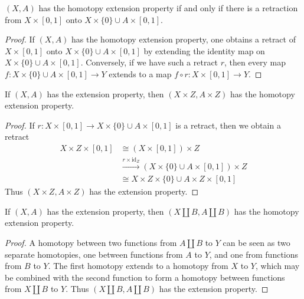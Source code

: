 \begin{lemma}
    $(X,A)$ has the homotopy extension property if and only if there is a retraction from $X \times [0,1]$ onto $X \times \{ 0 \} \cup A \times [0,1]$.
\end{lemma}
\begin{proof}
    If $(X,A)$ has the homotopy extension property, one obtains a retract of $X \times [0,1]$ onto $X \times \{ 0 \} \cup A \times [0,1]$ by extending the identity map on $X \times \{ 0 \} \cup A \times [0,1]$. Conversely, if we have such a retract $r$, then every map $f: X \times \{ 0 \} \cup A \times [0,1] \to Y$ extends to a map $f \circ r: X \times [0,1] \to Y$.
\end{proof}

\begin{corollary}
    If $(X,A)$ has the extension property, then $(X \times Z, A \times Z)$ has the homotopy extension property.
\end{corollary}
\begin{proof}
    If $r: X \times [0,1] \to X \times \{ 0 \} \cup A \times [0,1]$ is a retract, then we obtain a retract
    \begin{align*}
        X \times Z \times [0,1] &\cong (X \times [0,1]) \times Z\\
        &\xrightarrow{r \times \text{id}_Z} (X \times \{ 0 \} \cup A \times [0,1]) \times Z\\
        &\cong X \times Z \times \{ 0 \} \cup A \times Z \times [0,1]
    \end{align*}
    Thus $(X \times Z, A \times Z)$ has the extension property.
\end{proof}

\begin{corollary}
    If $(X,A)$ has the extension property, then $(X \coprod B, A \coprod B)$ has the homotopy extension property.
\end{corollary}
\begin{proof}
    A homotopy between two functions from $A \coprod B$ to $Y$ can be seen as two separate homotopies, one between functions from $A$ to $Y$, and one from functions from $B$ to $Y$. The first homotopy extends to a homotopy from $X$ to $Y$, which may be combined with the second function to form a homotopy between functions from $X \coprod B$ to $Y$. Thus $(X \coprod B, A \coprod B)$ has the extension property.
\end{proof}

